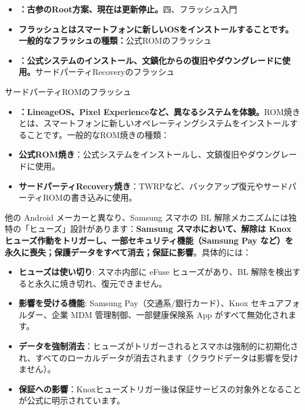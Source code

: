 
\begin{itemize}
  \item \textbf{：古参のRoot方案、現在は更新停止。}四、フラッシュ入門
  \item \textbf{フラッシュとはスマートフォンに新しいOSをインストールすることです。一般的なフラッシュの種類：}公式ROMのフラッシュ
  \item \textbf{：公式システムのインストール、文鎮化からの復旧やダウングレードに使用。}サードパーティRecoveryのフラッシュ
\end{itemize}


サードパーティROMのフラッシュ

\begin{itemize}
  \item \textbf{：LineageOS、Pixel Experienceなど、異なるシステムを体験。}ROM焼きとは、スマートフォンに新しいオペレーティングシステムをインストールすることです。一般的なROM焼きの種類：
  \item \textbf{公式ROM焼き}：公式システムをインストールし、文鎮復旧やダウングレードに使用。
  \item \textbf{サードパーティRecovery焼き}：TWRPなど、バックアップ復元やサードパーティROMの書き込みに使用。
\end{itemize}


他の Android メーカーと異なり、Samsung スマホの BL 解除メカニズムには独特の「ヒューズ」設計があります：\textbf{Samsung スマホにおいて、解除は Knox ヒューズ作動をトリガーし、一部セキュリティ機能（Samsung Pay など）を永久に喪失；保護データをすべて消去；保証に影響}。具体的には：

\begin{itemize}
  \item \textbf{ヒューズは使い切り}: スマホ内部に eFuse ヒューズがあり、BL 解除を検出すると永久に焼き切れ、復元できません。
  \item \textbf{影響を受ける機能}: Samsung Pay（交通系/銀行カード）、Knox セキュアフォルダー、企業 MDM 管理制御、一部健康保険系 App がすべて無効化されます。
  \item \textbf{データを強制消去}：ヒューズがトリガーされるとスマホは強制的に初期化され、すべてのローカルデータが消去されます（クラウドデータは影響を受けません）。
  \item \textbf{保証への影響}：Knoxヒューズトリガー後は保証サービスの対象外となることが公式に明示されています。
\end{itemize}

